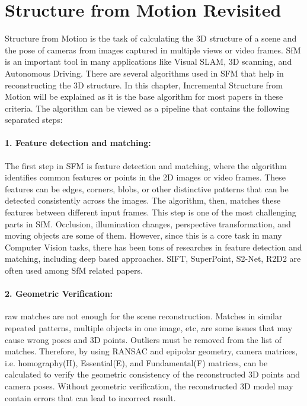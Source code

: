 \documentclass[11pt]{article}
\begin{document}
    \section{Structure from Motion Revisited}
    Structure from Motion is the task of calculating the 3D structure of a scene and the pose of cameras from
    images captured in multiple views or video frames. SfM is an important tool in many applications like
    Visual SLAM, 3D scanning, and Autonomous Driving. There are several algorithms used in SFM that help
    in reconstructing the 3D structure. In this chapter, Incremental Structure from Motion will be explained
    as it is the base algorithm for most papers in these criteria. The algorithm can be viewed as a pipeline 
    that contains the following separated steps:

    \paragraph{1. Feature detection and matching:} The first step in SFM is feature detection and matching, where
    the algorithm identifies common features or points in the 2D images or video frames. These features
    can be edges, corners, blobs, or other distinctive patterns that can be detected consistently across
    the images. The algorithm, then, matches these features between different input frames. This step is one
    of the most challenging parts in SfM. Occlusion, illumination changes, perspective transformation, and moving objects
    are some of them. However, since this is a core task in many Computer Vision tasks, there has been
    tons of researches in feature detection and matching, including deep based approaches. SIFT, SuperPoint, 
    S2-Net, R2D2 are often used among SfM related papers.
    
    \paragraph{2. Geometric Verification:} raw matches are not enough for the scene reconstruction.
    Matches in similar repeated patterns, multiple objects in one image, etc, are some issues that may cause wrong
    poses and 3D points. Outliers must be removed from the list of matches. Therefore, by using RANSAC and epipolar
    geometry, camera matrices, i.e. homography(H), Essential(E), and Fundamental(F) matrices, can be calculated
    to verify the geometric consistency of the reconstructed 3D points and camera poses.
    Without geometric verification, the reconstructed 3D model may contain errors that can lead to incorrect result.
\end{document}
